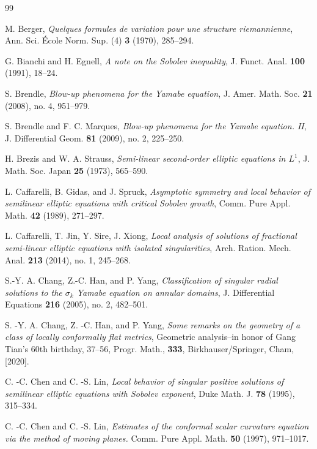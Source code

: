 \documentclass[11pt]{article}
\numberwithin{equation}{section}
\theoremstyle{remark}
\begin{document}
\begingroup
\small
\begin{thebibliography}{99}


{
M.  Berger,
\emph{Quelques formules de variation pour une structure riemannienne},
Ann. Sci. École Norm. Sup. (4) \textbf{3} (1970), 285--294.
}

G.  Bianchi and H.  Egnell,
\emph{A note on the Sobolev inequality},
J. Funct. Anal. \textbf{100} (1991), 18--24.

S. Brendle,
\emph{Blow-up phenomena for the Yamabe equation},
J. Amer. Math. Soc. \textbf{21} (2008), no. 4, 951--979.

S. Brendle and F. C. Marques,
\emph{Blow-up phenomena for the Yamabe equation. II},
J. Differential Geom. \textbf{81} (2009), no. 2, 225--250.

H.  Brezis and W.  A.  Strauss,
\emph{Semi-linear second-order elliptic equations in $L^1$},
J. Math. Soc. Japan \textbf{25} (1973), 565--590.

L.  Caffarelli, B.  Gidas, and J.  Spruck,
\emph{Asymptotic symmetry and local behavior of semilinear elliptic
equations with critical Sobolev growth},
Comm. Pure Appl. Math. \textbf{42} (1989), 271--297.

L.  Caffarelli, T.  Jin, Y.  Sire, J.  Xiong,  \emph{Local analysis of solutions of fractional semi-linear elliptic
equations with isolated singularities}, Arch. Ration. Mech. Anal. \textbf{213} (2014), no. 1, 245–268.

S.-Y. A. Chang, Z.-C. Han, and P. Yang,
\emph{Classification of singular radial solutions to the
$\sigma_k$ Yamabe equation on annular domains},
J. Differential Equations \textbf{216} (2005), no. 2, 482--501.

S.  -Y.  A.  Chang, Z.  -C.  Han, and P.  Yang, \emph{Some remarks on the geometry of a class of locally conformally flat metrics}, Geometric analysis--in honor of Gang Tian's 60th birthday, 37--56, Progr. Math., \textbf{333}, Birkhauser/Springer, Cham, [2020].

{
C.  -C.  Chen and C.  -S.  Lin,
\emph{Local behavior of singular positive solutions of semilinear elliptic
equations with Sobolev exponent},
Duke Math. J. \textbf{78} (1995), 315--334.
}

           
C.  -C.  Chen and  C.  -S.  Lin,
\emph{Estimates of the conformal scalar curvature equation via the method of moving planes.}
Comm. Pure Appl. Math. \textbf{50} (1997), 971--1017.
           

\end{thebibliography}
\end{document}
